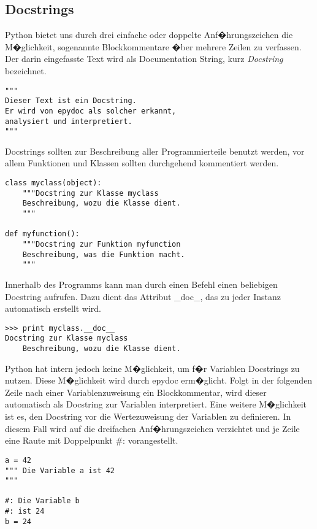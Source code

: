 \subsection*{Docstrings}
\label{documentation:sec:docstrings}

Python bietet uns durch drei einfache oder doppelte Anf�hrungszeichen die M�glichkeit, sogenannte Blockkommentare �ber mehrere Zeilen zu verfassen. 
Der darin eingefasste Text wird als Documentation String, kurz \textit{Docstring} bezeichnet. 

\begin{lstlisting}[label=documentation:lst:docstringbsp]
"""
Dieser Text ist ein Docstring.
Er wird von epydoc als solcher erkannt, 
analysiert und interpretiert.
"""
\end{lstlisting}

Docstrings sollten zur Beschreibung aller Programmierteile benutzt werden, vor allem Funktionen und Klassen sollten durchgehend kommentiert werden.

\begin{lstlisting}[label=documentation:lst:docstringbsp2]
class myclass(object): 
	"""Docstring zur Klasse myclass
	Beschreibung, wozu die Klasse dient.
	"""

def myfunction():
	"""Docstring zur Funktion myfunction
	Beschreibung, was die Funktion macht.
	"""
\end{lstlisting}

Innerhalb des Programms kann man durch einen Befehl einen beliebigen Docstring aufrufen. 
Dazu dient das Attribut _doc_, das zu jeder Instanz automatisch erstellt wird.

\begin{lstlisting}[label=documentation:lst:docstringausgeben]
>>> print myclass.__doc__
Docstring zur Klasse myclass
	Beschreibung, wozu die Klasse dient.
\end{lstlisting}


Python hat intern jedoch keine M�glichkeit, um f�r Variablen Docstrings zu nutzen. 
Diese M�glichkeit wird durch epydoc erm�glicht. 
Folgt in der folgenden Zeile nach einer Variablenzuweisung ein Blockkommentar, wird dieser automatisch als Docstring zur Variablen interpretiert. 
Eine weitere M�glichkeit ist es, den Docstring vor die Wertezuweisung der Variablen zu definieren. 
In diesem Fall wird auf die dreifachen Anf�hrungszeichen verzichtet und je Zeile eine Raute mit Doppelpunkt #: vorangestellt.

\begin{lstlisting}[label=documentation:lst:docstringepydoc]
a = 42
""" Die Variable a ist 42
"""

#: Die Variable b
#: ist 24
b = 24
\end{lstlisting}


